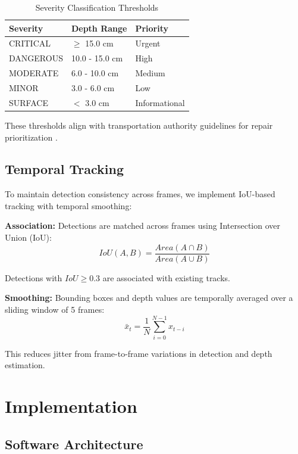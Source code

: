 \documentclass[conference]{IEEEtran}
\begin{document}
\begin{table}[h]
\centering
\caption{Severity Classification Thresholds}
\begin{tabular}{@{}lll@{}}
\toprule
\textbf{Severity} & \textbf{Depth Range} & \textbf{Priority} \\ \midrule
CRITICAL & $\geq$ 15.0 cm & Urgent \\
DANGEROUS & 10.0 - 15.0 cm & High \\
MODERATE & 6.0 - 10.0 cm & Medium \\
MINOR & 3.0 - 6.0 cm & Low \\
SURFACE & $<$ 3.0 cm & Informational \\ \bottomrule
\end{tabular}
\end{table}

These thresholds align with transportation authority guidelines for repair prioritization \cite{repair_standards}.

\subsection{Temporal Tracking}

To maintain detection consistency across frames, we implement IoU-based tracking with temporal smoothing:

\textbf{Association:} Detections are matched across frames using Intersection over Union (IoU):
\begin{equation}
IoU(A, B) = \frac{Area(A \cap B)}{Area(A \cup B)}
\end{equation}

Detections with $IoU \geq 0.3$ are associated with existing tracks.

\textbf{Smoothing:} Bounding boxes and depth values are temporally averaged over a sliding window of 5 frames:
\begin{equation}
\bar{x}_t = \frac{1}{N} \sum_{i=0}^{N-1} x_{t-i}
\end{equation}

This reduces jitter from frame-to-frame variations in detection and depth estimation.

\section{Implementation}

\subsection{Software Architecture}
\end{document}
